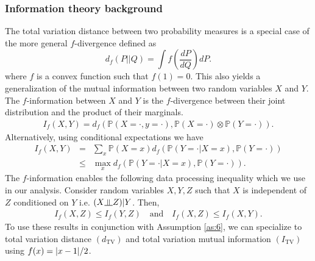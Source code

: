 \documentclass{colt2018} %
\newcommand{\indep}{\rotatebox[origin=c]{90}{$\models$}}
\begin{document}
\subsubsection{Information theory background}
\label{sec:info_back}
The total variation distance between two probability measures is a special case of the more general $f$-divergence defined as
\[
d_f(P||Q) = \int f(\frac{dP}{dQ}) dP.
\]
where $f$ is a convex function such that $f(1)=0$. This also yields a generalization of the mutual information between two random variables $X$ and $Y$. The $f$-information between $X$ and $Y$ is the $f$-divergence between their joint distribution and the product of their marginals.
\begin{eqnarray*}
I_f(X,Y) = d_f(\mathbb{P}(X=\cdot, y=\cdot), \mathbb{P}(X=\cdot) \otimes \mathbb{P}(Y=\cdot)).
\end{eqnarray*}
Alternatively, using conditional expectations we have
\begin{eqnarray}
I_f(X,Y) &=& \sum_x \mathbb{P}(X=x) d_f(\mathbb{P}(Y=\cdot|X=x), \mathbb{P}(Y=\cdot)) \nonumber \\
&\leq& \max_{x} d_f(\mathbb{P}(Y=\cdot|X=x), \mathbb{P}(Y=\cdot)). \label{eq:If_vs_df}
\end{eqnarray}
The $f$-information enables the following data processing inequality which we use in our analysis. Consider random variables $X,Y,Z$ such that $X$ is independent of $Z$ conditioned on $Y$ i.e. $(X \indep Z)|Y$. Then,
\begin{eqnarray}
\label{eq:data_proc_ineq}
I_f(X,Z) \leq I_f(Y,Z) \quad \text{and} \quad I_f(X,Z) \leq I_f(X,Y).
\end{eqnarray}
To use these results in conjunction with Assumption \ref{as:6}, we can specialize to total variation distance $(d_{\text{TV}})$ and total variation mutual information $(I_{\text{TV}})$ using $f(x) = \abs{x-1}/2$.
\end{document}
